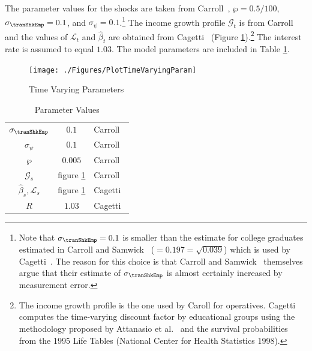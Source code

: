 \documentclass[titlepage, headings=optiontotocandhead]{econtex}
\begin{document}
The parameter values for the shocks are taken from Carroll~\citeyearpar{carroll:brookings}, $\wp=0.5/100$, $\sigma _{\tranShkEmp }=0.1$, and $\sigma_{\psi}=0.1$.\footnote{Note that $\sigma _{\tranShkEmp}=0.1$ is smaller than the estimate for college graduates estimated in
  Carroll and Samwick~\citeyearpar{carroll&samwick:nature} ($=0.197=\sqrt{0.039}$) which is used by Cagetti~\citeyearpar{cagettiWprofiles}. The reason for this choice is that Carroll and Samwick~\citeyearpar{carroll&samwick:nature} themselves argue that their estimate of $\sigma_{\tranShkEmp }$ is almost certainly increased by measurement error.} The income growth profile $\mathcal{G}_{t}$ is from Carroll~\citeyearpar{carrollBSLCPIH} and the values of $\mathcal{L}_{t}$ and $\hat{\beta}_{t}$ are obtained from Cagetti~\citeyearpar{cagettiWprofiles} (Figure \ref{fig:TimeVaryingParam}).\footnote{The income growth profile is the one used by Caroll for operatives. Cagetti computes the time-varying discount factor by educational groups using the methodology proposed by Attanasio et al.~\citeyearpar{AttanasioBanksMeghirWeber} and the survival probabilities from the 1995 Life Tables (National Center for Health Statistics 1998).} The interest rate is assumed to equal $1.03$. The model parameters are included in Table \ref{table:StrEstParams}.

\hypertarget{PlotTimeVaryingParam}{}
\begin{figure}[h]
  \texttt{[image: ./Figures/PlotTimeVaryingParam]}
  \caption{Time Varying Parameters}
  \label{fig:TimeVaryingParam}
\end{figure}

\begin{table}[h]
  \caption{Parameter Values}\label{table:StrEstParams}
  \begin{center}
    \begin{tabular}{ccl}
      \hline\hline
      $\sigma _{\tranShkEmp}$    & $0.1$ & Carroll~\citeyearpar{carroll:brookings}
      \\ $\sigma _{\psi}$   & $0.1$ & Carroll~\citeyearpar{carroll:brookings}
      \\ $\wp$           & $0.005$  & Carroll~\citeyearpar{carroll:brookings}
      \\ $\mathcal{G}_{s}$        & figure \ref{fig:TimeVaryingParam} & Carroll~\citeyearpar{carrollBSLCPIH}
      \\ $\hat{\beta}_{s},\mathcal{L}_{s}$ & figure \ref{fig:TimeVaryingParam} & Cagetti~\citeyearpar{cagettiWprofiles}
      \\$R$            & $1.03$  & Cagetti~\citeyearpar{cagettiWprofiles}\\
      \hline
    \end{tabular}
  \end{center}
\end{table}
\end{document}
